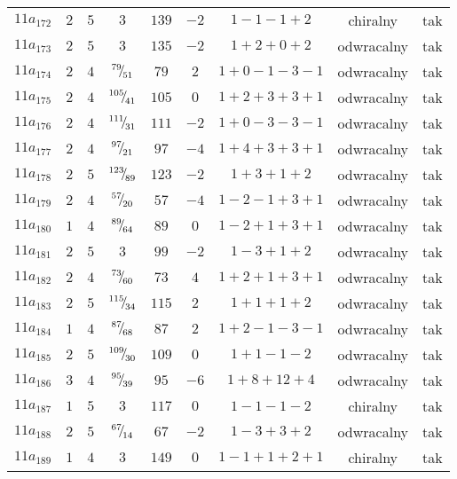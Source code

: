 \begin{longtable}{ccccccccc}
$11a_{172}$ & $2$ & $5$ & $3$ & $139$ & $-2$ & $1-1-1+2$ & chiralny & tak \\
$11a_{173}$ & $2$ & $5$ & $3$ & $135$ & $-2$ & $1+2+0+2$ & odwracalny & tak \\
$11a_{174}$ & $2$ & $4$ & ${}^{79}{\mskip -5mu/\mskip -3mu}_{51}$ & $79$ & $2$ & $1+0-1-3-1$ & odwracalny & tak \\
$11a_{175}$ & $2$ & $4$ & ${}^{105}{\mskip -5mu/\mskip -3mu}_{41}$ & $105$ & $0$ & $1+2+3+3+1$ & odwracalny & tak \\
$11a_{176}$ & $2$ & $4$ & ${}^{111}{\mskip -5mu/\mskip -3mu}_{31}$ & $111$ & $-2$ & $1+0-3-3-1$ & odwracalny & tak \\
$11a_{177}$ & $2$ & $4$ & ${}^{97}{\mskip -5mu/\mskip -3mu}_{21}$ & $97$ & $-4$ & $1+4+3+3+1$ & odwracalny & tak \\
$11a_{178}$ & $2$ & $5$ & ${}^{123}{\mskip -5mu/\mskip -3mu}_{89}$ & $123$ & $-2$ & $1+3+1+2$ & odwracalny & tak \\
$11a_{179}$ & $2$ & $4$ & ${}^{57}{\mskip -5mu/\mskip -3mu}_{20}$ & $57$ & $-4$ & $1-2-1+3+1$ & odwracalny & tak \\
$11a_{180}$ & $1$ & $4$ & ${}^{89}{\mskip -5mu/\mskip -3mu}_{64}$ & $89$ & $0$ & $1-2+1+3+1$ & odwracalny & tak \\
$11a_{181}$ & $2$ & $5$ & $3$ & $99$ & $-2$ & $1-3+1+2$ & odwracalny & tak \\
$11a_{182}$ & $2$ & $4$ & ${}^{73}{\mskip -5mu/\mskip -3mu}_{60}$ & $73$ & $4$ & $1+2+1+3+1$ & odwracalny & tak \\
$11a_{183}$ & $2$ & $5$ & ${}^{115}{\mskip -5mu/\mskip -3mu}_{34}$ & $115$ & $2$ & $1+1+1+2$ & odwracalny & tak \\
$11a_{184}$ & $1$ & $4$ & ${}^{87}{\mskip -5mu/\mskip -3mu}_{68}$ & $87$ & $2$ & $1+2-1-3-1$ & odwracalny & tak \\
$11a_{185}$ & $2$ & $5$ & ${}^{109}{\mskip -5mu/\mskip -3mu}_{30}$ & $109$ & $0$ & $1+1-1-2$ & odwracalny & tak \\
$11a_{186}$ & $3$ & $4$ & ${}^{95}{\mskip -5mu/\mskip -3mu}_{39}$ & $95$ & $-6$ & $1+8+12+4$ & odwracalny & tak \\
$11a_{187}$ & $1$ & $5$ & $3$ & $117$ & $0$ & $1-1-1-2$ & chiralny & tak \\
$11a_{188}$ & $2$ & $5$ & ${}^{67}{\mskip -5mu/\mskip -3mu}_{14}$ & $67$ & $-2$ & $1-3+3+2$ & odwracalny & tak \\
$11a_{189}$ & $1$ & $4$ & $3$ & $149$ & $0$ & $1-1+1+2+1$ & chiralny & tak \\

\end{longtable}

